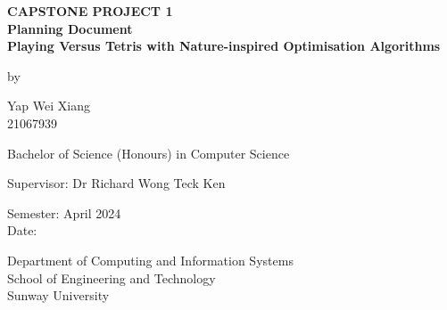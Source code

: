 \documentclass[a4paper, 12pt]{extreport}
\begin{document}
	\begin{titlepage}
		
		\centering
		
		\vspace{.5cm}
		
		\begin{center}
			\textbf{\large CAPSTONE PROJECT 1} \\
			\textbf{\large Planning Document} \\
			\vspace{1cm}
			\textbf{\large Playing Versus Tetris with Nature-inspired Optimisation Algorithms}
			
			\vspace{1cm}
			
			by
			
			\vspace{1cm}
			
			\large Yap Wei Xiang \\
			21067939
			
			\vspace{1cm}
			
			Bachelor of Science (Honours) in Computer Science
			
			\vspace{1cm}
			
			\large Supervisor: Dr Richard Wong Teck Ken
			
			\vspace{1cm}
			
			\normalsize Semester: April 2024 \\
			Date: %
			
			\vfill
			
			Department of Computing and Information Systems\\
			School of Engineering and Technology\\
			Sunway University
		\end{center}
		
	\end{titlepage}
	
\end{document}
